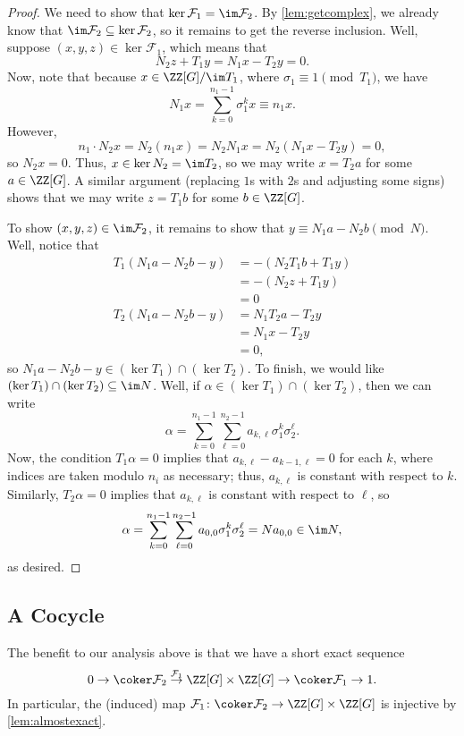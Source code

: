 \documentclass{article}
\begin{document}
\begin{proof}
	We need to show that $\ker\mathcal F_1=\im\mathcal F_2$. By \autoref{lem:getcomplex}, we already know that $\im\mathcal F_2\subseteq\ker\mathcal F_2$, so it remains to get the reverse inclusion. Well, suppose $(x,y,z)\in\ker\mathcal F_1$, which means that
	\[N_2z+T_1y=N_1x-T_2y=0.\]
	Now, note that because $x\in\ZZ[G]/\im T_1$, where $\sigma_1\equiv1\pmod{T_1}$, we have
	\[N_1x=\sum_{k=0}^{n_1-1}\sigma_1^kx\equiv n_1x.\]
	However,
	\[n_1\cdot N_2x=N_2(n_1x)=N_2N_1x=N_2(N_1x-T_2y)=0,\]
	so $N_2x=0$. Thus, $x\in\ker N_2=\im T_2$, so we may write $x=T_2a$ for some $a\in\ZZ[G]$. A similar argument (replacing $1$s with $2$s and adjusting some signs) shows that we may write $z=T_1b$ for some $b\in\ZZ[G]$.

	To show $(x,y,z)\in\im\mathcal F_2$, it remains to show that $y\equiv N_1a-N_2b\pmod N$. Well, notice that
	\begin{align*}
		T_1(N_1a-N_2b-y) &= -(N_2T_1b+T_1y) \\
		&= -(N_2z+T_1y) \\
		&= 0 \\
		T_2(N_1a-N_2b-y) &= N_1T_2a-T_2y \\
		&= N_1x-T_2y \\
		&= 0,
	\end{align*}
	so $N_1a-N_2b-y\in(\ker T_1)\cap(\ker T_2)$. To finish, we would like $(\ker T_1)\cap(\ker T_2)\subseteq\im N$. Well, if $\alpha\in(\ker T_1)\cap(\ker T_2)$, then we can write
	\[\alpha=\sum_{k=0}^{n_1-1}\sum_{\ell=0}^{n_2-1}a_{k,\ell}\sigma_1^k\sigma_2^\ell.\]
	Now, the condition $T_1\alpha=0$ implies that $a_{k,\ell}-a_{k-1,\ell}=0$ for each $k$, where indices are taken modulo $n_i$ as necessary; thus, $a_{k,\ell}$ is constant with respect to $k$. Similarly, $T_2\alpha=0$ implies that $a_{k,\ell}$ is constant with respect to $\ell$, so
	\[\alpha=\sum_{k=0}^{n_1-1}\sum_{\ell=0}^{n_2-1}a_{0,0}\sigma_1^k\sigma_2^\ell=Na_{0,0}\in\im N,\]
	as desired.
\end{proof}

\subsection{A Cocycle} \label{sec:cocycle}
The benefit to our analysis above is that we have a short exact sequence
\begin{equation}
	0\to\coker\mathcal F_2\stackrel{\mathcal F_1}\to\ZZ[G]\times\ZZ[G]\to\coker\mathcal F_1\to1. \label{eq:ses}
\end{equation}
In particular, the (induced) map $\mathcal F_1\colon\coker\mathcal F_2\to\ZZ[G]\times\ZZ[G]$ is injective by \autoref{lem:almostexact}.
\end{document}
